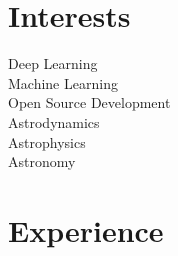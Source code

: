 \documentclass[]{deedy-resume-openfont}
\begin{document}
\begin{minipage}[t]{0.33\textwidth}
\section{Interests}
Deep Learning\\
Machine Learning\\
Open Source Development\\
Astrodynamics\\
Astrophysics\\
Astronomy


%
%

\end{minipage} 
\hfill
\begin{minipage}[t]{0.66\textwidth} 


\section{Experience}

\vspace{\topsep} %

\sectionsep




\end{minipage}
\end{document}
